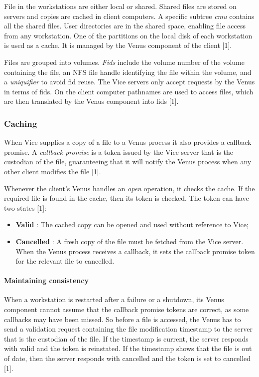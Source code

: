 File in the workstations are either local or shared. Shared files are stored on servers and copies are cached in client computers. A specific subtree \textit{cmu} contains all the shared files. User directories are in the shared space, enabling file access from any workstation. One of the partitions on the local disk of each workstation is used as a cache. It is managed by the Venus component of the client [1].

Files are grouped into volumes. \emph{Fids} include the volume number of the volume containing the file, an NFS file handle identifying the file within the volume, and a \textit{uniquifier} to avoid fid reuse. The Vice servers only accept requests by the Venus in terms of fids. On the client computer pathnames are used to access files, which are then translated by the Venus component into fids [1].



\subsubsection{Caching}

When Vice supplies a copy of a file to a Venus process it also provides a callback promise. A \emph{callback promise} is a token issued by the Vice server that is the custodian of the file, guaranteeing that it will notify the Venus process when any other client modifies the file [1].

Whenever the client's Venus handles an \textit{open} operation, it checks the cache. If the required file is found in the cache, then its token is checked. The token can have two states [1]:
\begin{itemize}
	\item \textbf{Valid} : The cached copy can be opened and used without reference to Vice;
	\item \textbf{Cancelled} : A fresh copy of the file must be fetched from the Vice server. When the Venus process receives a callback, it sets the callback promise token for the relevant file to cancelled.
\end{itemize}


\paragraph{Maintaining consistency}

When a workstation is restarted after a failure or a shutdown, its Venus component cannot assume that the callback promise tokens are correct, as some callbacks may have been missed. So before a file is accessed, the Venus has to send a validation request containing the file modification timestamp to the server that is the custodian of the file. If the timestamp is current, the server responds with valid and the token is reinstated. If the timestamp shows that the file is out of date, then the server responds with cancelled and the token is set to cancelled [1].

